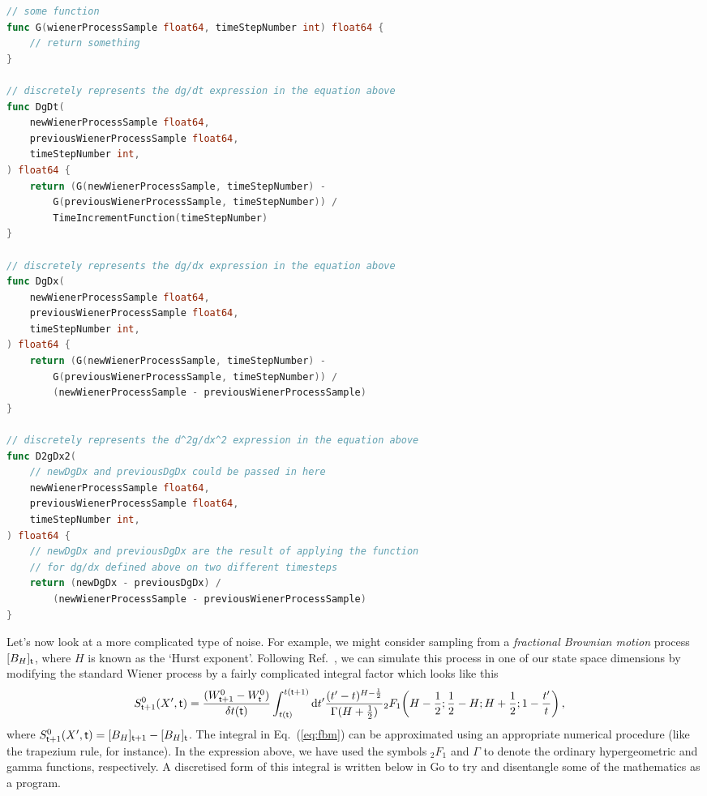 \documentclass{book}
\begin{document}
\begin{lstlisting}[language=Go]
// some function
func G(wienerProcessSample float64, timeStepNumber int) float64 {
    // return something
}

// discretely represents the dg/dt expression in the equation above
func DgDt(
    newWienerProcessSample float64, 
    previousWienerProcessSample float64,
    timeStepNumber int,
) float64 {
    return (G(newWienerProcessSample, timeStepNumber) - 
        G(previousWienerProcessSample, timeStepNumber)) / 
        TimeIncrementFunction(timeStepNumber)
}

// discretely represents the dg/dx expression in the equation above
func DgDx(
    newWienerProcessSample float64, 
    previousWienerProcessSample float64,
    timeStepNumber int,
) float64 {
    return (G(newWienerProcessSample, timeStepNumber) - 
        G(previousWienerProcessSample, timeStepNumber)) / 
        (newWienerProcessSample - previousWienerProcessSample)
}

// discretely represents the d^2g/dx^2 expression in the equation above
func D2gDx2(
    // newDgDx and previousDgDx could be passed in here
    newWienerProcessSample float64, 
    previousWienerProcessSample float64,
    timeStepNumber int,
) float64 {
    // newDgDx and previousDgDx are the result of applying the function 
    // for dg/dx defined above on two different timesteps
    return (newDgDx - previousDgDx) / 
        (newWienerProcessSample - previousWienerProcessSample)
}
\end{lstlisting}

Let's now look at a more complicated type of noise. For example, we might consider sampling from a \emph{fractional Brownian motion} process $[B_{H}]_{\sf t}$, where $H$ is known as the `Hurst exponent'. Following Ref.~\cite{decreusefond1999stochastic}, we can simulate this process in one of our state space dimensions by modifying the standard Wiener process by a fairly complicated integral factor which looks like this
\begin{align}
S^{0}_{{\sf t}+1}(X',{\sf t}) &= \frac{(W^0_{{\sf t}+1} - W^0_{\sf t})}{\delta t({\sf t})}\int^{t({\sf t}+1)}_{t({\sf t})}{\rm d}t' \frac{(t'-t)^{H-\frac{1}{2}}}{\Gamma (H+\frac{1}{2})} {}_2F_1 \bigg( H-\frac{1}{2};\frac{1}{2}-H;H+\frac{1}{2};1-\frac{t'}{t}\bigg) \label{eq:fbm} \,,
\end{align}
where $S^{0}_{{\sf t}+1}(X',{\sf t})=[B_{H}]_{{\sf t}+1}-[B_{H}]_{{\sf t}}$. The integral in Eq.~(\ref{eq:fbm}) can be approximated using an appropriate numerical procedure (like the trapezium rule, for instance). In the expression above, we have used the symbols ${}_2F_1$ and $\Gamma$ to denote the ordinary hypergeometric and gamma functions, respectively. A discretised form of this integral is written below in Go to try and disentangle some of the mathematics as a program.
\end{document}
